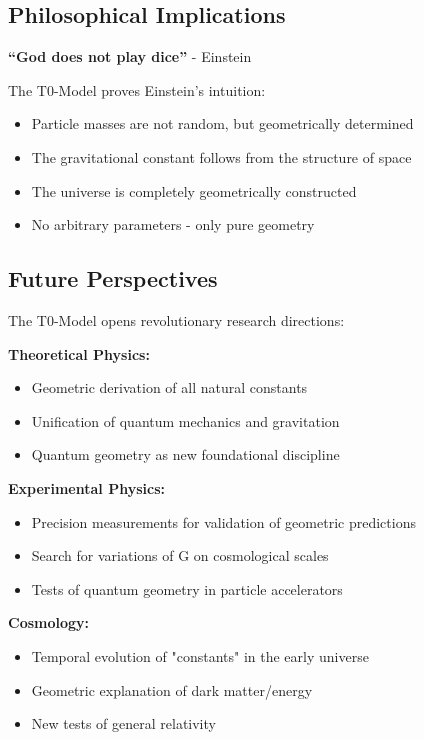 \documentclass[12pt,a4paper]{article}
\begin{document}
	\subsection{Philosophical Implications}
	
	\begin{tcolorbox}[colback=blue!5!white,colframe=blue!75!black,title=Einstein's Vision Fulfilled]
		\textbf{``God does not play dice''} - Einstein
		
		The T0-Model proves Einstein's intuition:
		\begin{itemize}
			\item Particle masses are not random, but geometrically determined
			\item The gravitational constant follows from the structure of space
			\item The universe is completely geometrically constructed
			\item No arbitrary parameters - only pure geometry
		\end{itemize}
	\end{tcolorbox}
	
	\subsection{Future Perspectives}
	
	The T0-Model opens revolutionary research directions:
	
	\textbf{Theoretical Physics:}
	\begin{itemize}
		\item Geometric derivation of all natural constants
		\item Unification of quantum mechanics and gravitation
		\item Quantum geometry as new foundational discipline
	\end{itemize}
	
	\textbf{Experimental Physics:}
	\begin{itemize}
		\item Precision measurements for validation of geometric predictions
		\item Search for variations of G on cosmological scales
		\item Tests of quantum geometry in particle accelerators
	\end{itemize}
	
	\textbf{Cosmology:}
	\begin{itemize}
		\item Temporal evolution of "constants" in the early universe
		\item Geometric explanation of dark matter/energy
		\item New tests of general relativity
	\end{itemize}
	
\end{document}
